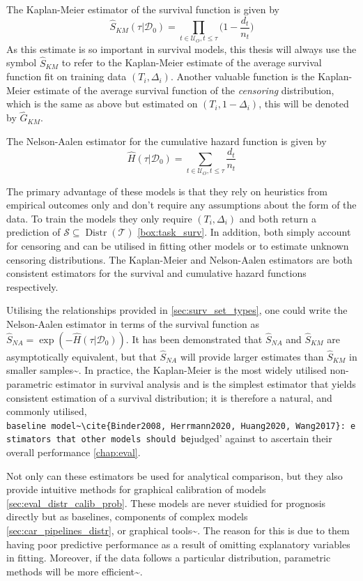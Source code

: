 \documentclass[
  letterpaper,
]{scrbook}
\theoremstyle{plain}
\theoremstyle{definition}
\theoremstyle{remark}
\begin{document}
The Kaplan-Meier estimator of the survival function is given by \[
\label{eq:km}
\hat{S}_{KM}(\tau|\mathcal{D}_0) = \prod_{t \in \mathcal{U}_O, t \leq \tau} \Big(1 - \frac{d_t}{n_t}\Big)
\] As this estimate is so important in survival models, this thesis will
always use the symbol \(\hat{S}_{KM}\) to refer to the Kaplan-Meier
estimate of the average survival function fit on training data
\((T_i, \Delta_i)\). Another valuable function is the Kaplan-Meier
estimate of the average survival function of the \emph{censoring}
distribution, which is the same as above but estimated on
\((T_i, 1 - \Delta_i)\), this will be denoted by \(\hat{G}_{KM}\).

The Nelson-Aalen estimator for the cumulative hazard function is given
by \[
\label{eq:na}
\hat{H}(\tau|\mathcal{D}_0) = \sum_{t \in \mathcal{U}_O, t \leq \tau} \frac{d_t}{n_t}
\]

The primary advantage of these models is that they rely on heuristics
from empirical outcomes only and don't require any assumptions about the
form of the data. To train the models they only require
\((T_i,\Delta_i)\) and both return a prediction of
\(\mathcal{S}\subseteq \operatorname{Distr}(\mathcal{T})\)
\ref{box:task_surv}. In addition, both simply account for censoring and
can be utilised in fitting other models or to estimate unknown censoring
distributions. The Kaplan-Meier and Nelson-Aalen estimators are both
consistent estimators for the survival and cumulative hazard functions
respectively.

Utilising the relationships provided in \ref{sec:surv_set_types}, one
could write the Nelson-Aalen estimator in terms of the survival function
as \(\hat{S}_{NA} = \exp(-\hat{H}(\tau|\mathcal{D}_0))\). It has been
demonstrated that \(\hat{S}_{NA}\) and \(\hat{S}_{KM}\) are
asymptotically equivalent, but that \(\hat{S}_{NA}\) will provide larger
estimates than \(\hat{S}_{KM}\) in smaller
samples\textasciitilde{}\cite{Colosimo2002}. In practice, the
Kaplan-Meier is the most widely utilised non-parametric estimator in
survival analysis and is the simplest estimator that yields consistent
estimation of a survival distribution; it is therefore a natural, and
commonly utilised,
\texttt{baseline\textquotesingle{}\ model\textasciitilde{}\textbackslash{}cite\{Binder2008,\ Herrmann2020,\ Huang2020,\ Wang2017\}:\ estimators\ that\ other\ models\ should\ be}judged'
against to ascertain their overall performance \ref{chap:eval}.

Not only can these estimators be used for analytical comparison, but
they also provide intuitive methods for graphical calibration of models
\ref{sec:eval_distr_calib_prob}. These models are never stuidied for
prognosis directly but as baselines, components of complex models
\ref{sec:car_pipelines_distr}, or graphical
tools\textasciitilde{}\cite{Habibi2018, Jager2008, Moghimi-dehkordi2008}.
The reason for this is due to them having poor predictive performance as
a result of omitting explanatory variables in fitting. Moreover, if the
data follows a particular distribution, parametric methods will be more
efficient\textasciitilde{}\cite{Wang2017}.
\end{document}
